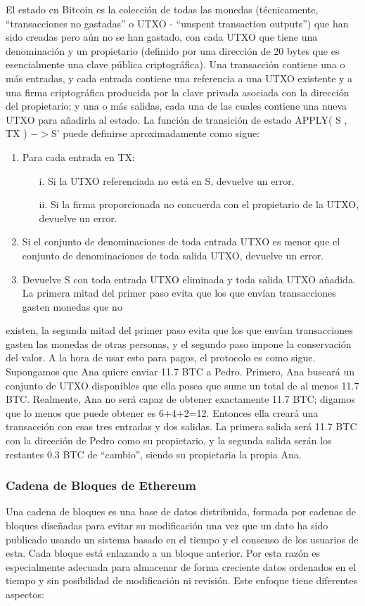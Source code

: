 \documentclass[11pt,a4paper]{article}
\begin{document}
El estado en Bitcoin es la colección de todas las monedas (técnicamente, “transacciones no
gastadas” o UTXO - “unspent transaction outputs”) que han sido creadas pero aún no se han
gastado, con cada UTXO que tiene una denominación y un propietario (definido por una dirección
de 20 bytes que es esencialmente una clave pública criptográfica). Una transacción contiene una
o más entradas, y cada entrada contiene una referencia a una UTXO existente y a una firma
criptográfica producida por la clave privada asociada con la dirección del propietario; y una o más
salidas, cada una de las cuales contiene una nueva UTXO para añadirla al estado.
La función de transición de estado APPLY( S , TX ) $->$S' puede definirse aproximadamente
como sigue:
\begin{enumerate}
\item Para cada entrada en TX:
  \begin{enumerate}
  \item[i.] Si la UTXO referenciada no está en S, devuelve un error.
  \item[ii.] Si la firma proporcionada no concuerda con el propietario de la UTXO, devuelve
  un error.
  \end{enumerate}
\item Si el conjunto de denominaciones de toda entrada UTXO es menor que el conjunto de
  denominaciones de toda salida UTXO, devuelve un error.
\item Devuelve S con toda entrada UTXO eliminada y toda salida UTXO añadida.
  La primera mitad del primer paso evita que los que envían transacciones gasten monedas que no
\end{enumerate}
existen, la segunda mitad del primer paso evita que los que envían transacciones gasten las monedas de otras personas, y el segundo paso impone la conservación del valor. A la hora de usar esto para pagos, el protocolo es como sigue. Supongamos que Ana quiere enviar 11.7 BTC a Pedro. Primero, Ana buscará un conjunto de UTXO disponibles que ella posea que sume un total de al menos 11.7 BTC. Realmente, Ana no será capaz de obtener exactamente 11.7 BTC;
digamos que lo menos que puede obtener es 6+4+2=12. Entonces ella creará una transacción con esas tres entradas y dos salidas. La primera salida será 11.7 BTC con la dirección de Pedro como su propietario, y la segunda salida serán los restantes 0.3 BTC de “cambio”, siendo su propietaria la propia Ana.

\subsubsection{Cadena de Bloques de Ethereum}
Una cadena de bloques es una base de datos distribuida, formada por cadenas de bloques diseñadas para evitar su modificación una vez que un dato ha sido publicado usando un sistema basado en el tiempo y el consenso de los usuarios de esta. Cada bloque está enlazando a un bloque anterior. Por esta razón es especialmente adecuada para almacenar de forma creciente datos ordenados en el tiempo y sin posibilidad de modificación ni revisión. Este enfoque tiene diferentes aspectos:
\end{document}
